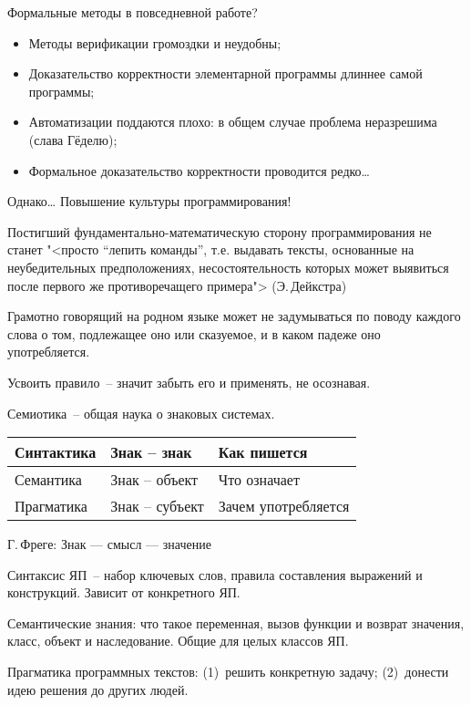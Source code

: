 \documentclass[landscape]{slides}
\begin{document}
\begin{slide}
Формальные методы в повседневной работе?
\begin{itemize}
\item Методы верификации громоздки и неудобны;
\item Доказательство корректности элементарной программы
        длиннее самой программы;
\item Автоматизации поддаются плохо: в общем случае проблема
        неразрешима (слава Гёделю);
\item Формальное доказательство корректности проводится редко\ldots
\end{itemize}
\end{slide}

\begin{slide}
Однако\ldots
Повышение культуры программирования!

Постигший фундаментально-математическую сторону программирования
не станет
"<просто ``лепить команды'', т.е. выдавать тексты, основанные на неубедительных
предположениях, несостоятельность которых может выявиться после первого же
противоречащего примера"> (Э.\,Дейкстра)

Грамотно говорящий на родном языке может не задумываться по поводу каждого
слова о том, подлежащее оно или сказуемое, и в каком падеже оно употребляется.

Усвоить правило~-- значит забыть его и применять, не осознавая.
\end{slide}

\begin{slide}
Семиотика~-- общая наука о знаковых системах.

\begin{center}
\begin{tabular}{|l|l|l|}
        \hline
        Синтактика & Знак -- знак    & Как пишется         \\ \hline
        Семантика  & Знак -- объект  & Что означает        \\ \hline
        Прагматика & Знак -- субъект & Зачем употребляется \\ \hline
\end{tabular}
\end{center}

Г.\,Фреге: Знак --- смысл --- значение

Синтаксис ЯП~-- набор ключевых слов, правила составления выражений и
конструкций. Зависит от конкретного ЯП.

Семантические знания: что такое переменная, вызов функции и возврат
значения, класс, объект и наследование. Общие для целых классов ЯП.

Прагматика программных текстов: (1)~решить конкретную задачу;
(2)~донести идею решения до других людей.
\end{slide}
\end{document}
